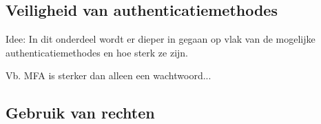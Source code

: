 \subsection{Veiligheid van authenticatiemethodes}

Idee: In dit onderdeel wordt er dieper in gegaan op vlak van de mogelijke authenticatiemethodes en hoe sterk ze zijn.

Vb. MFA is sterker dan alleen een wachtwoord...

\subsection{Gebruik van rechten}




